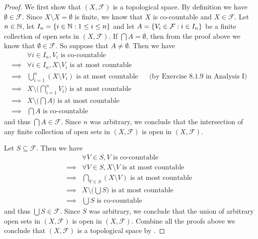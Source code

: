 \begin{proof}
  We first show that \((X, \mathcal{F})\) is a topological space.
  By definition we have \(\emptyset \in \mathcal{F}\).
  Since \(X \setminus X = \emptyset\) is finite, we know that \(X\) is co-countable and \(X \in \mathcal{F}\).
  Let \(n \in \mathbb{N}\), let \(I_n = \left\lbrace i \in \mathbb{N} : 1 \leq i \leq n\right\rbrace\) and let \(A = \left\lbrace V_i \in \mathcal{F} : i \in I_n\right\rbrace\) be a finite collection of open sets in \((X, \mathcal{F})\).
  If \(\bigcap A = \emptyset\), then from the proof above we know that \(\emptyset \in \mathcal{F}\).
  So suppose that \(A \neq \emptyset\).
  Then we have
  \begin{align*}
             & \forall i \in I_n, V_i \text{ is co-countable}                                                                           \\
    \implies & \forall i \in I_n, X \setminus V_i \text{ is at most countable}                                                          \\
    \implies & \bigcup_{i = 1}^n (X \setminus V_i) \text{ is at most countable}           &  & \text{(by Exercise 8.1.9 in Analysis I)} \\
    \implies & X \setminus \bigg(\bigcap_{i = 1}^n V_i\bigg) \text{ is at most countable}                                               \\
    \implies & X \setminus \bigg(\bigcap A\bigg) \text{ is at most countable}                                                           \\
    \implies & \bigcap A \text{ is co-countable}
  \end{align*}
  and thus \(\bigcap A \in \mathcal{F}\).
  Since \(n\) was arbitrary, we conclude that the intersection of any finite collection of open sets in \((X, \mathcal{F})\) is open in \((X, \mathcal{F})\).

  Let \(S \subseteq \mathcal{F}\).
  Then we have
  \begin{align*}
             & \forall V \in S, V \text{ is co-countable}                     \\
    \implies & \forall V \in S, X \setminus V \text{ is at most countable}    \\
    \implies & \bigcap_{V \in S} (X \setminus V) \text{ is at most countable} \\
    \implies & X \setminus \bigg(\bigcup S\bigg) \text{ is at most countable} \\
    \implies & \bigcup S \text{ is co-countable}
  \end{align*}
  and thus \(\bigcup S \in \mathcal{F}\).
  Since \(S\) was arbitrary, we conclude that the union of arbitrary open sets in \((X, \mathcal{F})\) is open in \((X, \mathcal{F})\).
  Combine all the proofs above we conclude that \((X, \mathcal{F})\) is a topological space by .


\end{proof}
